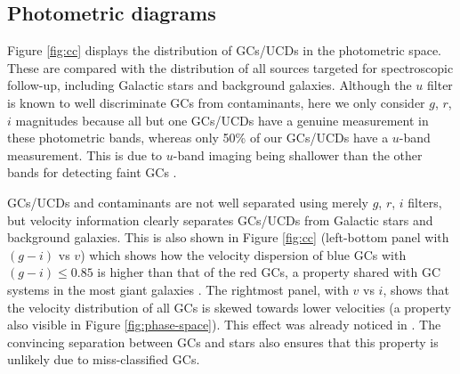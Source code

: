 \documentclass[useAMS,usenatbib]{mn2e}
\begin{document}
\subsection{Photometric diagrams}


Figure \ref{fig:cc} displays the distribution of GCs/UCDs in the photometric 
space. These are compared with the distribution of all sources targeted for 
spectroscopic follow-up, including Galactic stars and background galaxies. 
Although the $u$ filter is known to well discriminate GCs from contaminants, 
here we only consider $g$, $r$, $i$ magnitudes because all but one GCs/UCDs 
have a genuine measurement in these photometric bands, whereas only 50\% of our 
GCs/UCDs have a $u$-band measurement. This is due to $u$-band imaging being 
shallower than the other bands for detecting faint GCs \citep{DAbrusco16}.

GCs/UCDs and contaminants are not well separated using merely $g$, $r$, $i$ 
filters, but velocity information clearly separates GCs/UCDs from Galactic 
stars and background galaxies. This is also shown in Figure \ref{fig:cc} 
(left-bottom panel with $(g-i)$ vs $v$) which shows how the velocity 
dispersion of blue GCs with $(g-i) \le 0.85$ is higher than that of the red GCs, a 
property shared with GC systems in the most giant galaxies \citep[e.g.,][]{Pota13}. 
The rightmost panel, with $v$ vs $i$, shows that 
the velocity distribution of all GCs is skewed towards lower velocities (a 
property also visible in Figure \ref{fig:phase-space}). This effect was already 
noticed in \citet{Schuberth}. The convincing separation between GCs and stars 
also ensures that this property is unlikely due to miss-classified GCs. 
\end{document}
